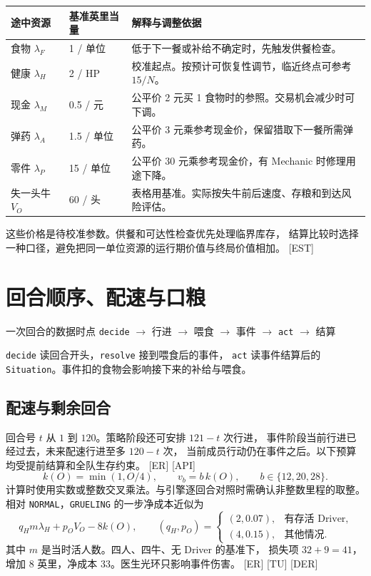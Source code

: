 \documentclass[UTF8,11pt,a4paper]{ctexart}
\newcommand{\src}[1]{\textup{\small\textcolor{muted}{[#1]}}}
\newcommand{\api}[1]{\texttt{#1}}
\newcommand{\ox}{V_O}
\begin{document}
\begin{center}\small
\begin{tabularx}{\linewidth}{@{}L{2.9cm}L{2.4cm}Y@{}}
\toprule
途中资源 & 基准英里当量 & 解释与调整依据 \\
\midrule
食物 $\lambda_F$ & 1 / 单位 & 低于下一餐或补给不确定时，先触发供餐检查。 \\
健康 $\lambda_H$ & 2 / HP & 校准起点。按预计可恢复性调节，临近终点可参考 $15/N$。 \\
现金 $\lambda_M$ & 0.5 / 元 & 公平价 2 元买 1 食物时的参照。交易机会减少时可下调。 \\
弹药 $\lambda_A$ & 1.5 / 单位 & 公平价 3 元乘参考现金价，保留猎取下一餐所需弹药。 \\
零件 $\lambda_P$ & 15 / 单位 & 公平价 30 元乘参考现金价，有 Mechanic 时修理用途下降。 \\
失一头牛 $\ox$ & 60 / 头 & 表格用基准。实际按失牛前后速度、存粮和到达风险评估。 \\
\bottomrule
\end{tabularx}
\end{center}

\noindent 这些价格是待校准参数。供餐和可达性检查优先处理临界库存，
结算比较时选择一种口径，避免把同一单位资源的运行期价值与终局价值相加。 \src{EST}

\section{回合顺序、配速与口粮}\label{sec:turn}

\begin{keybox}{一次回合的数据时点}
\centering
\api{decide} $\longrightarrow$ 行进 $\longrightarrow$ 喂食
$\longrightarrow$ 事件 $\longrightarrow$ \api{act} $\longrightarrow$ 结算
\par\smallskip\RaggedRight
\api{decide} 读回合开头，\api{resolve} 接到喂食后的事件，
\api{act} 读事件结算后的 \api{Situation}。事件扣的食物会影响接下来的补给与喂食。
\end{keybox}

\subsection{配速与剩余回合}

回合号 $t$ 从 $1$ 到 $120$。策略阶段还可安排 $121-t$ 次行进，
事件阶段当前行进已经过去，未来配速行进至多 $120-t$ 次，
当前成员行动仍在事件之后。以下预算均受提前结算和全队生存约束。 \src{ER} \src{API}
\[
 k(O)=\min(1,O/4),\qquad
 v_b=b\,k(O),\qquad b\in\{12,20,28\}.
\]
计算时使用实数或整数交叉乘法。与引擎逐回合对照时需确认非整数里程的取整。
相对 \api{NORMAL}，\api{GRUELING} 的一步净成本近似为
\[
  q_H m\lambda_H+p_O\ox-8k(O),\qquad
  (q_H,p_O)=
  \begin{cases}
  (2,0.07), & \text{有存活 Driver},\\
  (4,0.15), & \text{其他情况}.
  \end{cases}
\]
其中 $m$ 是当时活人数。四人、四牛、无 Driver 的基准下，
损失项 $32+9=41$，增加 8 英里，净成本 33。医生光环只影响事件伤害。 \src{ER} \src{TU} \src{DER}
\end{document}
